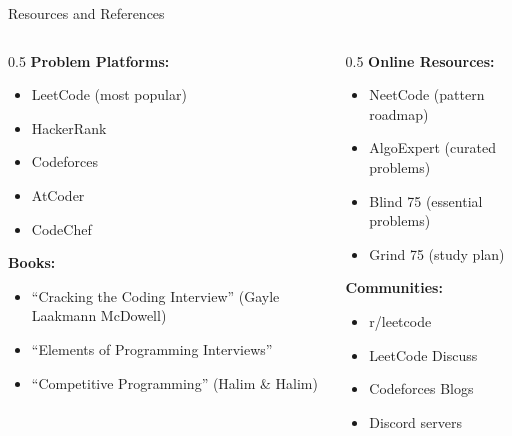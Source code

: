 \documentclass[aspectratio=169,xcolor=dvipsnames]{beamer}
\begin{document}
\begin{frame}{Resources and References}
  \begin{columns}
    \begin{column}{0.5\textwidth}
      \textbf{Problem Platforms:}
      \begin{itemize}
        \item LeetCode (most popular)
        \item HackerRank
        \item Codeforces
        \item AtCoder
        \item CodeChef
      \end{itemize}

      \vspace{0.3cm}
      \textbf{Books:}
      \begin{itemize}
        \item ``Cracking the Coding Interview'' (Gayle Laakmann McDowell)
        \item ``Elements of Programming Interviews''
        \item ``Competitive Programming'' (Halim \& Halim)
      \end{itemize}
    \end{column}

    \begin{column}{0.5\textwidth}
      \textbf{Online Resources:}
      \begin{itemize}
        \item NeetCode (pattern roadmap)
        \item AlgoExpert (curated problems)
        \item Blind 75 (essential problems)
        \item Grind 75 (study plan)
      \end{itemize}

      \vspace{0.3cm}
      \textbf{Communities:}
      \begin{itemize}
        \item r/leetcode
        \item LeetCode Discuss
        \item Codeforces Blogs
        \item Discord servers
      \end{itemize}
    \end{column}
  \end{columns}
\end{frame}
\end{document}
